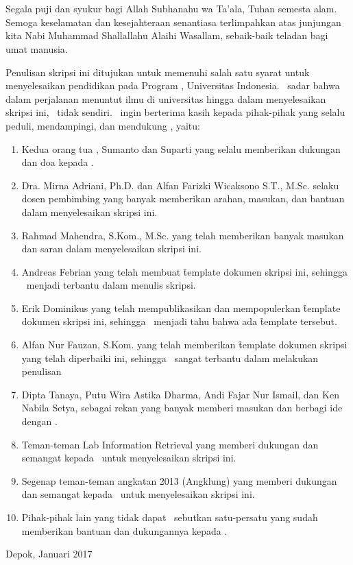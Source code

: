 \chapter*{\kataPengantar}

Segala puji dan syukur bagi Allah Subhanahu wa Ta'ala, Tuhan semesta alam. Semoga keselamatan dan kesejahteraan senantiasa terlimpahkan atas junjungan kita Nabi Muhammad Shallallahu Alaihi Wasallam, sebaik-baik teladan bagi umat manusia.

Penulisan skripsi ini ditujukan untuk memenuhi salah satu syarat untuk menyelesaikan pendidikan pada Program \gelar, Universitas Indonesia. \Saya~sadar bahwa dalam perjalanan menuntut ilmu di universitas hingga dalam menyelesaikan skripsi ini, \saya~tidak sendiri. \Saya~ingin berterima kasih kepada pihak-pihak yang selalu peduli, mendampingi, dan mendukung \saya, yaitu:

\begin{enumerate}
	\item Kedua orang tua \saya, Sumanto dan Suparti yang selalu memberikan dukungan dan doa kepada \saya.
	\item Dra. Mirna Adriani, Ph.D. dan Alfan Farizki Wicaksono S.T., M.Sc. selaku dosen pembimbing yang banyak memberikan arahan, masukan, dan bantuan dalam menyelesaikan skripsi ini.
	\item Rahmad Mahendra, S.Kom., M.Sc. yang telah memberikan banyak masukan dan saran dalam menyelesaikan skripsi ini.
	\item Andreas Febrian yang telah membuat \f{template} dokumen skripsi ini, sehingga \saya~menjadi terbantu dalam menulis skripsi.
	\item Erik Dominikus yang telah mempublikasikan dan mempopulerkan \f{template} dokumen skripsi ini, sehingga \saya~menjadi tahu bahwa ada \f{template} tersebut.
	\item Alfan Nur Fauzan, S.Kom. yang telah memberikan \f{template} dokumen skripsi yang telah diperbaiki ini, sehingga \saya~sangat terbantu dalam melakukan penulisan
	\item Dipta Tanaya, Putu Wira Astika Dharma, Andi Fajar Nur Ismail, dan Ken Nabila Setya, sebagai rekan yang banyak memberi masukan dan berbagi ide dengan \saya.
	\item Teman-teman Lab Information Retrieval yang memberi dukungan dan semangat kepada \saya~untuk menyelesaikan skripsi ini.
	\item Segenap teman-teman angkatan 2013 (Angklung) yang memberi dukungan dan semangat kepada \saya~untuk menyelesaikan skripsi ini.
	\item Pihak-pihak lain yang tidak dapat \saya~sebutkan satu-persatu yang sudah memberikan bantuan dan dukungannya kepada \saya.
\end{enumerate}
\vspace*{0.1cm}
\begin{flushright}
Depok, Januari 2017\\[0.1cm]
\vspace*{1cm}
\penulis

\end{flushright}